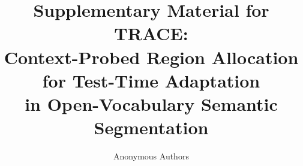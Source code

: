 \documentclass[letterpaper]{article}
\title{Supplementary Material for TRACE:\\Context-Probed Region Allocation for Test-Time Adaptation\\in Open-Vocabulary Semantic Segmentation}
\author{Anonymous Authors}
\begin{document}
\raggedbottom
\maketitle
\appendix


\end{document}
